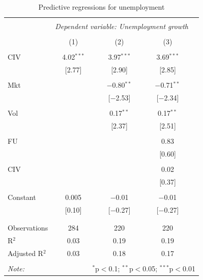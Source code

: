 \documentclass[12pt]{article}
\begin{document}
\begin{table}[!htbp] \centering 
  \caption{Predictive regressions for unemployment} 
  \label{} 
\begin{tabular}{@{\extracolsep{5pt}}lccc} 
\\[-1.8ex]\hline 
\hline \\[-1.8ex] 
 & \multicolumn{3}{c}{\textit{Dependent variable: Unemployment growth}} \\ 
\cline{2-4} 
\\[-1.8ex] & (1) & (2) & (3)\\ 
\hline \\[-1.8ex] 
 CIV & 4.02$^{***}$ & 3.97$^{***}$ & 3.69$^{***}$ \\ 
  & [2.77] & [2.90] & [2.85] \\ 
  & & & \\ 
 Mkt &  & $-$0.80$^{**}$ & $-$0.71$^{**}$ \\ 
  &  & [$-$2.53] & [$-$2.34] \\ 
  & & & \\ 
 Vol &  & 0.17$^{**}$ & 0.17$^{**}$ \\ 
  &  & [2.37] & [2.51] \\ 
  & & & \\ 
 FU &  &  & 0.83 \\ 
  &  &  & [0.60] \\ 
  & & & \\ 
 CIV &  &  & 0.02 \\ 
  &  &  & [0.37] \\ 
  & & & \\ 
 Constant & 0.005 & $-$0.01 & $-$0.01 \\ 
  & [0.10] & [$-$0.27] & [$-$0.27] \\ 
  & & & \\ 
\hline \\[-1.8ex] 
Observations & 284 & 220 & 220 \\ 
R$^{2}$ & 0.03 & 0.19 & 0.19 \\ 
Adjusted R$^{2}$ & 0.03 & 0.18 & 0.17 \\ 
\hline 
\hline \\[-1.8ex] 
\textit{Note:}  & \multicolumn{4}{r}{$^{*}$p$<$0.1; $^{**}$p$<$0.05; $^{***}$p$<$0.01} \\ 
\end{tabular} 
\end{table} 
\end{document}
